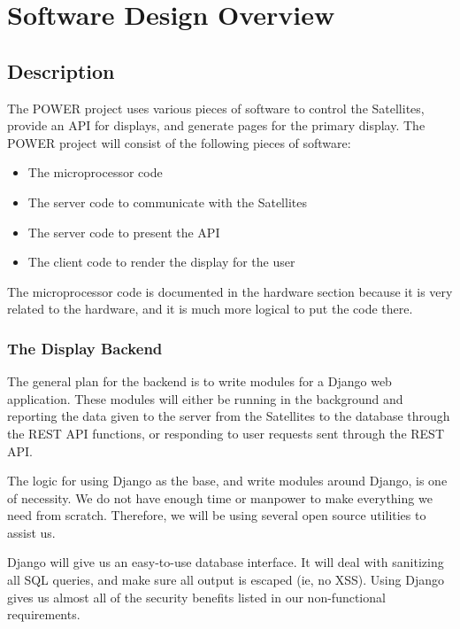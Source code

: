
\chapter{Software Design Overview}

\section{Description}

The POWER project uses various pieces of software to control the Satellites, provide an API for displays, and generate pages for the primary display. The POWER project will consist of the following pieces of software:
\begin{itemize}
 \item The microprocessor code
 \item The server code to communicate with the Satellites
 \item The server code to present the API
 \item The client code to render the display for the user
\end{itemize}

The microprocessor code is documented in the hardware section because it is very related to the hardware, and it is much more logical to put the  code there.

\subsection{The Display Backend}

The general plan for the backend is to write modules for a Django web application. These modules will either be running in the background and reporting the data given to the server from the Satellites to the database through the REST API functions, or responding to user requests sent through the REST API.

The logic for using Django as the base, and write modules around Django, is one of necessity. We do not have enough time or manpower to make everything we need from scratch. Therefore, we will be using several open source utilities to assist us. 

Django will give us an easy-to-use database interface. It will deal with sanitizing all SQL queries, and make sure all output is escaped (ie, no XSS). Using Django gives us almost all of the security benefits listed in our non-functional requirements.

